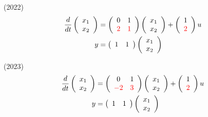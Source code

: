 \documentclass[a4paper,11pt,fleqn]{jreport}
\begin{document}
(2022)
\begin{align*}
	\frac{d}{dt}
	\left (
	\begin{array}{c}
	 x_1 \\ x_2 
	\end{array}
	\right )
	& = 
	\left (
	\begin{array}{cc}
	 0 & 1 \\
	 \color{red} 2 & \color{red} 1
	\end{array}
	\right )
	\left (
	\begin{array}{c}
	 x_1 \\ x_2 
	\end{array}
	\right )
	+
	\left (
	\begin{array}{c}
	 1 \\ \color{red} 2
	\end{array}
	\right )
	u
\\
	y 
	&=
	\left (
	\begin{array}{cc}
	 1 & 1  
	\end{array}
	\right )
	\left (
	\begin{array}{c}
	 x_1 \\ x_2 
	\end{array}
	\right )
\end{align*}

(2023)
\begin{align*}
	\frac{d}{dt}
	\left (
	\begin{array}{c}
	 x_1 \\ x_2 
	\end{array}
	\right )
	& = 
	\left (
	\begin{array}{cc}
	 0 & 1 \\
	 \color{red} -2 & \color{red} 3
	\end{array}
	\right )
	\left (
	\begin{array}{c}
	 x_1 \\ x_2 
	\end{array}
	\right )
	+
	\left (
	\begin{array}{c}
	 1 \\ \color{red} 2
	\end{array}
	\right )
	u
\\
	y 
	&=
	\left (
	\begin{array}{cc}
	 1 & 1  
	\end{array}
	\right )
	\left (
	\begin{array}{c}
	 x_1 \\ x_2 
	\end{array}
	\right )
\end{align*}
\end{document}
